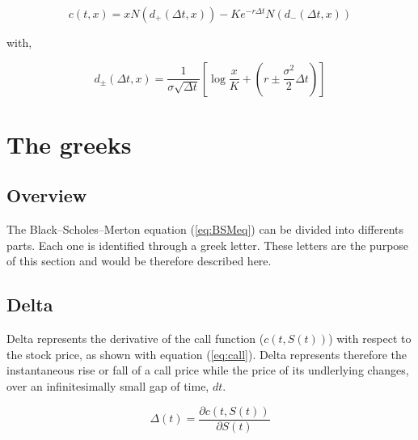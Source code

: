 \documentclass[12pt]{report}
\newcommand{\Dt}{\Delta t}
\newcommand{\ct}{c\left(t, x\right)}
\newcommand{\N}[1]{N\left(#1\right)}
\newcommand{\dsub}[1]{d_{#1}\left(\Dt, x\right)}
\newcommand{\call}[2]{c\left( #1, #2\right)}
\newcommand{\St}{S\left(t\right)}
\newcommand{\BSMsol}{\ct = x\N{\dsub{+}} - K e^{-r\Dt} \N{\dsub{-}}}
\newcommand{\dpm}{\dsub{\pm} = \frac{1}{\sigma\sqrt{\Dt}} \left[\log\frac{x}{K} + \left(r \pm \frac{\sigma^2}{2}\Dt\right)\right]}
\begin{document}
\begin{center}
  \begin{equation}
    \BSMsol
    \label{eq:BSMsol}
  \end{equation}
\end{center}

with,

\begin{center}
  \begin{equation}
    \dpm
    \label{eq:dpm}
  \end{equation}
\end{center}




\section{The greeks}
\label{sec:greeks}

\subsection{Overview}
\label{sub:GreeksOverview}

The Black--Scholes--Merton equation (\ref{eq:BSMeq}) can be divided into differents parts.
Each one is identified through a greek letter. These letters are the purpose of this section and would be therefore described here.

\subsection{Delta}
\label{sub:Delta}

Delta represents the derivative of the call function ($\call{t}{\St}$) with respect to the stock price, as shown with equation (\ref{eq:call}).
Delta represents therefore the instantaneous rise or fall of a call price while the price of its undlerlying changes, over an infinitesimally small gap of time, $dt$.

\begin{center}
  \begin{equation}
    \Delta (t) = \frac{\partial \call{t}{\St}}{\partial \St}
    \label{eq:call}
  \end{equation}
\end{center}
\end{document}
